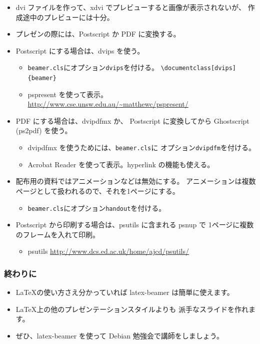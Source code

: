 \documentclass[mingoth,a4paper]{jsarticle}
\begin{document}
\begin{itemize}
\item dvi ファイルを作って、xdvi でプレビューすると画像が表示されないが、
  作成途中のプレビューには十分。
\item プレゼンの際には、Postscript か PDF に変換する。
\item Postscript にする場合は、dvips を使う。
  \begin{itemize}
  \item \texttt{beamer.cls}にオプション\texttt{dvips}を付ける。
    \verb|\documentclass[dvips]{beamer}|
  \item pspresent を使って表示。
    \url{http://www.cse.unsw.edu.au/~matthewc/pspresent/}
  \end{itemize}
\item PDF にする場合は、dvipdfmx か、
  Postscript に変換してから Ghostscript (ps2pdf) を使う。
  \begin{itemize}
  \item dvipdfmx を使うためには、\texttt{beamer.cls}に
    オプション\texttt{dvipdfm}を付ける。
  \item Acrobat Reader を使って表示。hyperlink の機能も使える。
  \end{itemize}
\item 配布用の資料ではアニメーションなどは無効にする。
  アニメーションは複数ページとして扱われるので、それを1ページにする。
  \begin{itemize}
  \item \texttt{beamer.cls}にオプション\texttt{handout}を付ける。
  \end{itemize}
\item Postscript から印刷する場合は、psutils に含まれる
  psnup で 1ページに複数のフレームを入れて印刷。
  \begin{itemize}
  \item psutils
    \url{http://www.dcs.ed.ac.uk/home/ajcd/psutils/}
  \end{itemize}
\end{itemize}


\subsubsection{終わりに}


\begin{itemize}
\item \LaTeX{}の使い方さえ分かっていれば
  latex-beamer は簡単に使えます。
\item \LaTeX{}上の他のプレゼンテーションスタイルよりも
  派手なスライドを作れます。
\item ぜひ、latex-beamer を使って Debian 勉強会で講師をしましょう。
\end{itemize}
\end{document}
